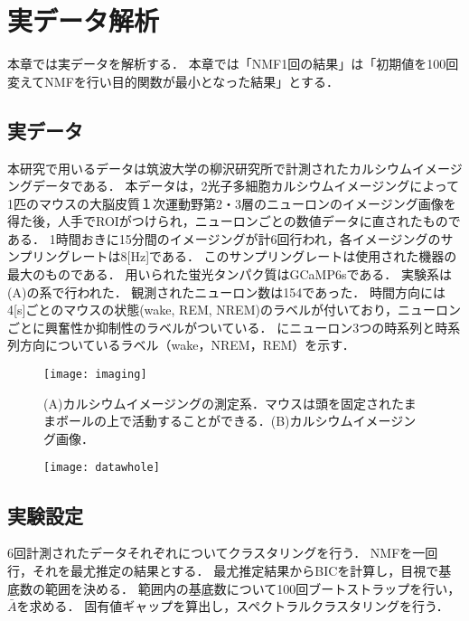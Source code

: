 \section{実データ解析}
本章では実データを解析する．
本章では「NMF1回の結果」は「初期値を100回変えてNMFを行い目的関数が最小となった結果」とする．

\subsection{実データ}
本研究で用いるデータは筑波大学の柳沢研究所で計測されたカルシウムイメージングデータである．
本データは，2光子多細胞カルシウムイメージングによって1匹のマウスの大脳皮質１次運動野第2・3層のニューロンのイメージング画像を得た後，人手でROIがつけられ，ニューロンごとの数値データに直されたものである．
1時間おきに15分間のイメージングが計6回行われ，各イメージングのサンプリングレートは8[Hz]である．
このサンプリングレートは使用された機器の最大のものである．
用いられた蛍光タンパク質はGCaMP6sである．
実験系は(A)の系で行われた\cite{Kanda2016}．
観測されたニューロン数は154であった．
時間方向には4[s]ごとのマウスの状態(wake, REM, NREM)のラベルが付いており，ニューロンごとに興奮性か抑制性のラベルがついている．
にニューロン3つの時系列と時系列方向についているラベル（wake，NREM，REM）を示す．

\begin{figure}[htbp]
    \begin{center}
				\texttt{[image: imaging]}
				\caption{(A)カルシウムイメージングの測定系．マウスは頭を固定されたままボールの上で活動することができる．(B)カルシウムイメージング画像．}
        \label{fig:imaging}
    \end{center}
\end{figure}

\begin{figure}[htbp]
	\begin{center}
		\texttt{[image: datawhole]}
	\end{center}
	\label{fig:wholedata}
\end{figure}

\subsection{実験設定}
6回計測されたデータそれぞれについてクラスタリングを行う．
NMFを一回行，それを最尤推定の結果とする．
最尤推定結果からBICを計算し，目視で基底数の範囲を決める．
範囲内の基底数について100回ブートストラップを行い，$\bar{A}$を求める．
固有値ギャップを算出し，スペクトラルクラスタリングを行う．

